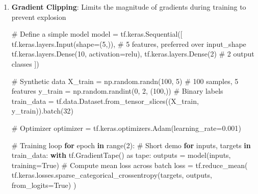 \documentclass[
  letterpaper,
  DIV=11,
  numbers=noendperiod]{scrreprt}
\newenvironment{Shaded}{\begin{snugshade}}{\end{snugshade}}
\newcommand{\BuiltInTok}[1]{\textcolor[rgb]{0.00,0.23,0.31}{#1}}
\newcommand{\CommentTok}[1]{\textcolor[rgb]{0.37,0.37,0.37}{#1}}
\newcommand{\ControlFlowTok}[1]{\textcolor[rgb]{0.00,0.23,0.31}{\textbf{#1}}}
\newcommand{\DecValTok}[1]{\textcolor[rgb]{0.68,0.00,0.00}{#1}}
\newcommand{\FloatTok}[1]{\textcolor[rgb]{0.68,0.00,0.00}{#1}}
\newcommand{\ImportTok}[1]{\textcolor[rgb]{0.00,0.46,0.62}{#1}}
\newcommand{\KeywordTok}[1]{\textcolor[rgb]{0.00,0.23,0.31}{\textbf{#1}}}
\newcommand{\NormalTok}[1]{\textcolor[rgb]{0.00,0.23,0.31}{#1}}
\newcommand{\OperatorTok}[1]{\textcolor[rgb]{0.37,0.37,0.37}{#1}}
\newcommand{\StringTok}[1]{\textcolor[rgb]{0.13,0.47,0.30}{#1}}
\newcommand{\VariableTok}[1]{\textcolor[rgb]{0.07,0.07,0.07}{#1}}
\begin{document}
\begin{enumerate}
\def\labelenumi{\arabic{enumi}.}
\item
  \textbf{Gradient Clipping}: Limits the magnitude of gradients during
  training to prevent explosion

\begin{Shaded}
\begin{Highlighting}[]
 \CommentTok{\# Define a simple model}
\NormalTok{ model }\OperatorTok{=}\NormalTok{ tf.keras.Sequential([}
\NormalTok{     tf.keras.layers.Input(shape}\OperatorTok{=}\NormalTok{(}\DecValTok{5}\NormalTok{,)),  }\CommentTok{\# 5 features, preferred over input\_shape}
\NormalTok{     tf.keras.layers.Dense(}\DecValTok{10}\NormalTok{, activation}\OperatorTok{=}\StringTok{\textquotesingle{}relu\textquotesingle{}}\NormalTok{),}
\NormalTok{     tf.keras.layers.Dense(}\DecValTok{2}\NormalTok{)  }\CommentTok{\# 2 output classes}
\NormalTok{ ])}

 \CommentTok{\# Synthetic data}
\NormalTok{ X\_train }\OperatorTok{=}\NormalTok{ np.random.randn(}\DecValTok{100}\NormalTok{, }\DecValTok{5}\NormalTok{)  }\CommentTok{\# 100 samples, 5 features}
\NormalTok{ y\_train }\OperatorTok{=}\NormalTok{ np.random.randint(}\DecValTok{0}\NormalTok{, }\DecValTok{2}\NormalTok{, (}\DecValTok{100}\NormalTok{,))  }\CommentTok{\# Binary labels}
\NormalTok{ train\_data }\OperatorTok{=}\NormalTok{ tf.data.Dataset.from\_tensor\_slices((X\_train, y\_train)).batch(}\DecValTok{32}\NormalTok{)}

 \CommentTok{\# Optimizer}
\NormalTok{ optimizer }\OperatorTok{=}\NormalTok{ tf.keras.optimizers.Adam(learning\_rate}\OperatorTok{=}\FloatTok{0.001}\NormalTok{)}

 \CommentTok{\# Training loop}
 \ControlFlowTok{for}\NormalTok{ epoch }\KeywordTok{in} \BuiltInTok{range}\NormalTok{(}\DecValTok{2}\NormalTok{):  }\CommentTok{\# Short demo}
     \ControlFlowTok{for}\NormalTok{ inputs, targets }\KeywordTok{in}\NormalTok{ train\_data:}
         \ControlFlowTok{with}\NormalTok{ tf.GradientTape() }\ImportTok{as}\NormalTok{ tape:}
\NormalTok{             outputs }\OperatorTok{=}\NormalTok{ model(inputs, training}\OperatorTok{=}\VariableTok{True}\NormalTok{)}
             \CommentTok{\# Compute mean loss across batch}
\NormalTok{             loss }\OperatorTok{=}\NormalTok{ tf.reduce\_mean(}
\NormalTok{                 tf.keras.losses.sparse\_categorical\_crossentropy(targets, outputs, from\_logits}\OperatorTok{=}\VariableTok{True}\NormalTok{)}
\NormalTok{             )}


\end{Highlighting}
\end{Shaded}
\end{enumerate}
\end{document}
